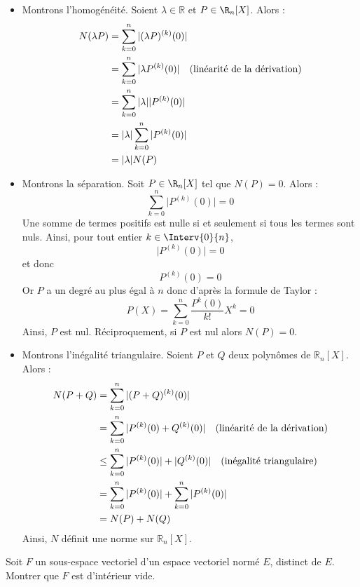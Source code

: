 \documentclass[a4paper,10pt]{report}
\begin{document}
\begin{itemize}
\item Montrons l'homogénéité. Soient $\lambda \in \mathbb{R}$ et $P \in  \R_n[X ]$. Alors :
\begin{align*}
N(\lambda P) & =  \sum_{k = 0}^{ n } \vert (\lambda P)^{(k)} (0) \vert  \\
& =  \sum_{k = 0}^{ n }  \vert \lambda P^{(k)} (0) \vert \quad \hbox{(linéarité de la dérivation)} \\
& =  \sum_{k = 0}^{ n } \vert \lambda \vert \vert P^{(k)} (0) \vert \\
& = \vert \lambda \vert \sum_{k = 0}^{ n } \vert P^{(k)} (0) \vert \\
& = \vert \lambda \vert N(P) 
\end{align*}
\item Montrons la séparation. Soit $P \in  \R_n[X ]$ tel que $N(P)=0$. Alors :  
$$ \sum_{k = 0}^{ n } \vert P^{(k)} (0) \vert =0$$
Une somme de termes positifs est nulle si et seulement si tous les termes sont nuls. Ainsi, pour tout entier $k \in \Interv{0}{n}$,
$$  \vert P^{(k)} (0) \vert = 0$$
et donc 
$$   P^{(k)} (0)  = 0$$
Or $P$ a un degré au plus égal à $n$ donc d'après la formule de Taylor :
$$ P(X) = \sum_{k=0}^n \dfrac{P^{k}(0)}{k!} X^k = 0$$
Ainsi, $P$ est nul. Réciproquement, si $P$ est nul alors $N(P)=0$.
\item Montrons l'inégalité triangulaire. Soient $P$ et $Q$ deux polynômes de $\mathbb{R}_n[X]$. Alors :
\begin{align*}
N(P+Q) & = \sum_{k = 0}^{ n } \vert (P+Q)^{(k)} (0) \vert \\
& = \sum_{k = 0}^{ n } \vert P^{(k)} (0) +  Q^{(k)} (0) \vert \quad \hbox{(linéarité de la dérivation)} \\
& \leq \sum_{k = 0}^{ n } \vert P^{(k)} (0) \vert +  \vert Q^{(k)} (0) \vert \quad \hbox{(inégalité triangulaire)} \\
& = \sum_{k = 0}^{ n } \vert P^{(k)} (0) \vert + \sum_{k = 0}^{ n } \vert P^{(k)} (0) \vert \\
& = N(P) + N(Q)
\end{align*}
Ainsi, $N$ définit une norme sur $\mathbb{R}_n[X]$.
\end{itemize}

\begin{Exercice}{} Soit $F$ un sous-espace vectoriel d'un espace vectoriel normé $E$, distinct de $E$. Montrer que $F$ est d'intérieur vide.
\end{Exercice}
\end{document}
